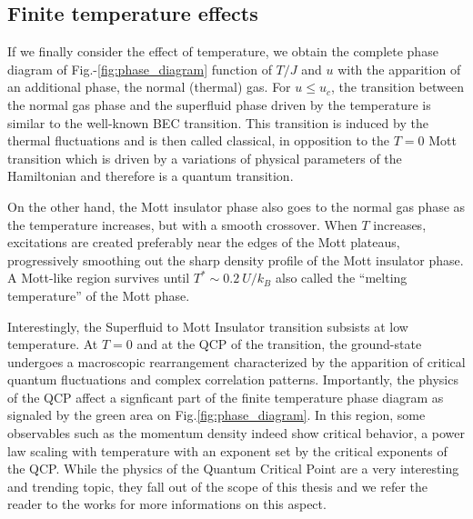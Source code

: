 \subsection{Finite temperature effects}

If we finally consider the effect of temperature, we obtain the complete phase diagram of Fig.-\ref{fig:phase_diagram} function of $T/J$ and $u$ with the apparition of an additional phase, the normal (thermal) gas. For $u \leq u_c$, the transition between the normal gas phase and the superfluid phase driven by the temperature is similar to the well-known BEC transition. This transition is induced by the thermal fluctuations and is then called classical, in opposition to the $T=0$ Mott transition which is driven by a variations of physical parameters of the Hamiltonian and therefore is a quantum transition.

On the other hand, the Mott insulator phase also goes to the normal gas phase as the temperature increases, but with a smooth crossover. When $T$ increases, excitations are created preferably near the edges of the Mott plateaus, progressively smoothing out the sharp density profile of the Mott insulator phase. A Mott-like region survives until $T^* \sim 0.2 \ U/k_B$ \cite{gerbier2007boson} also called the ``melting temperature'' of the Mott phase.

Interestingly, the Superfluid to Mott Insulator transition subsists at low temperature. At $T=0$ and at the QCP of the transition, the ground-state undergoes a macroscopic rearrangement characterized by the apparition of critical quantum fluctuations and complex correlation patterns. Importantly, the physics of the QCP affect a signficant part of the finite temperature phase diagram as signaled by the green area on Fig.\ref{fig:phase_diagram}. In this region, some observables such as the momentum density indeed show critical behavior, \ie a power law scaling with temperature with an exponent set by the critical exponents of the QCP. While the physics of the Quantum Critical Point are a very interesting and trending topic, they fall out of the scope of this thesis and we refer the reader to the works \cite{carcy_these,frerot2019reconstructing,sachdev2011quantum} for more informations on this aspect.


